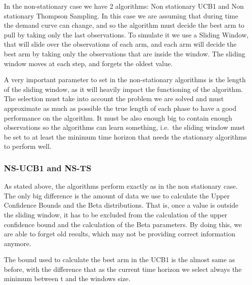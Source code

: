 In the non-stationary case we have 2 algorithms: Non stationary UCB1 and Non stationary Thompson Sampling.
In this case we are assuming that during time the demand curve can change, and so the algorithm must decide the best arm to pull
by taking only the last observations. To simulate it we use a Sliding Window, that will slide over the observations of each arm,
and each arm will decide the best arm by taking only the observations that are inside the window.
The sliding window moves at each step, and forgets the oldest value.
 
A very important parameter to set in the non-stationary algorithms is the length of the sliding window,
as it will heavily impact the functioning of the algorithm.
The selection must take into account the problem we are solved and must approximate as much as possible the true length of
each phase to have a good performance on the algorithm. It must be also enough big to contain enough observations so
the algorithms can learn something, i.e.\ the sliding window must be set to at least the minimum time horizon that needs
the stationary algorithms to perform well.


\subsubsection{NS-UCB1 and NS-TS}

As stated above, the algorithms perform exactly as in the non stationary case.
The only big difference is the amount of data we use to calculate the Upper Confidence Bounds and the Beta distributions.
That is, once a value is outside the sliding window, it has to be excluded from the calculation of the upper confidence
bound and the calculation of the Beta parameters. By doing this, we are able to forget old results,
which may not be providing correct information anymore.

The bound used to calculate the best arm in the UCB1 is the almost same as before, with the difference that as the current
time horizon we select always the minimum between t and the windows size.